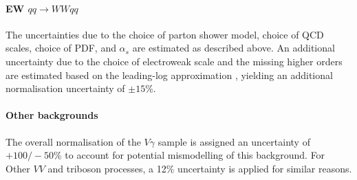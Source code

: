 \paragraph{EW $qq \to WWqq$}
The uncertainties due to the choice of parton shower model, choice of QCD scales, choice of PDF, and $\alpha_s$ are estimated as described above.
An additional uncertainty due to the choice of electroweak scale and the missing higher orders are estimated based on the leading-log approximation \cite{Denner_2019}, yielding an additional normalisation uncertainty of $\pm 15$\%. 




\paragraph{Other backgrounds}
The overall normalisation of the $V\gamma$ sample is assigned an uncertainty of $+100/-50\%$ to account for potential mismodelling of this background. For Other $VV$ and triboson processes, a 12\% uncertainty is applied for similar reasons. 



